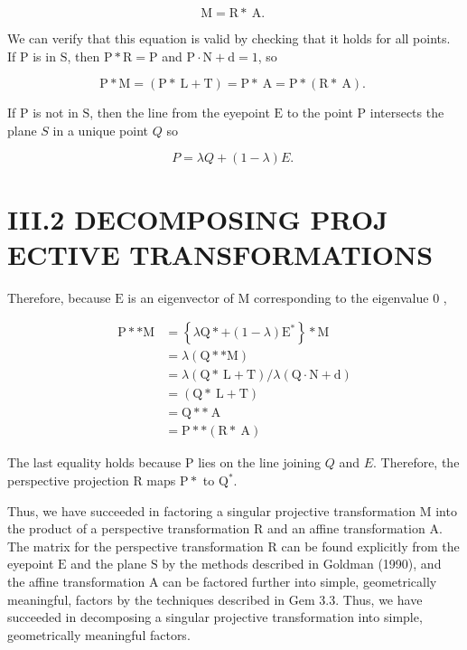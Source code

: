 $$
\mathrm{M}=\mathrm{R} * \mathrm{~A} \text {. }
$$

We can verify that this equation is valid by checking that it holds for all points. If $\mathrm{P}$ is in $\mathrm{S}$, then $\mathrm{P} * \mathrm{R}=\mathrm{P}$ and $\mathrm{P} \cdot \mathrm{N}+\mathrm{d}=1$, so

$$
\mathrm{P} * \mathrm{M}=(\mathrm{P} * \mathrm{~L}+\mathrm{T})=\mathrm{P} * \mathrm{~A}=\mathrm{P} *(\mathrm{R} * \mathrm{~A}) \text {. }
$$

If $\mathrm{P}$ is not in $\mathrm{S}$, then the line from the eyepoint $\mathrm{E}$ to the point $\mathrm{P}$ intersects the plane $S$ in a unique point $Q$ so

$$
P=\lambda Q+(1-\lambda) E \text {. }
$$

\section{III.2 DECOMPOSING PROJ ECTIVE TRANSFORMATIONS}
Therefore, because $\mathrm{E}$ is an eigenvector of $\mathrm{M}$ corresponding to the eigenvalue 0 ,

$$
\begin{aligned}
\mathrm{P} * * \mathrm{M} &=\left\{\lambda \mathrm{Q} *+(1-\lambda) \mathrm{E}^{*}\right\} * \mathrm{M} \\
&=\lambda(\mathrm{Q} * * \mathrm{M}) \\
&=\lambda(\mathrm{Q} * \mathrm{~L}+\mathrm{T}) / \lambda(\mathrm{Q} \cdot \mathrm{N}+\mathrm{d}) \\
&=(\mathrm{Q} * \mathrm{~L}+\mathrm{T}) \\
&=\mathrm{Q} * * \mathrm{~A} \\
&=\mathrm{P} * *(\mathrm{R} * \mathrm{~A})
\end{aligned}
$$

The last equality holds because $\mathrm{P}$ lies on the line joining $Q$ and $E$. Therefore, the perspective projection $\mathrm{R}$ maps $\mathrm{P} *$ to $\mathrm{Q}^{*}$.

Thus, we have succeeded in factoring a singular projective transformation $\mathrm{M}$ into the product of a perspective transformation $\mathrm{R}$ and an affine transformation A. The matrix for the perspective transformation $\mathrm{R}$ can be found explicitly from the eyepoint $\mathrm{E}$ and the plane $\mathrm{S}$ by the methods described in Goldman (1990), and the affine transformation A can be factored further into simple, geometrically meaningful, factors by the techniques described in Gem 3.3. Thus, we have succeeded in decomposing a singular projective transformation into simple, geometrically meaningful factors.

